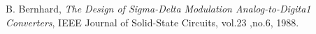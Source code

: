 \documentclass[conference]{IEEEtran}
\begin{document}















%
%
%


\begin{thebibliography}{1}

\bibitem{}
B. Bernhard, \emph{The Design of Sigma-Delta Modulation Analog-to-Digita1 Converters}, IEEE Journal of Solid-State Circuits, vol.23 ,no.6, 1988.

\end{thebibliography}

\end{document}
